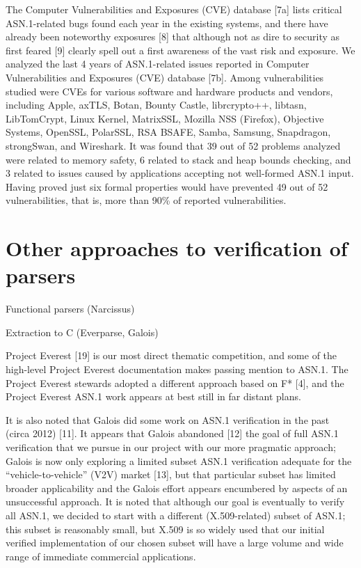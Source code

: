 \documentclass[acmsmall,nonacm]{acmart}
\begin{document}
 The Computer Vulnerabilities and Exposures (CVE) database [7a] lists critical ASN.1-related bugs found each year in the existing systems, and there have already been noteworthy exposures [8] that although not as dire to security as first feared [9] clearly spell out a first awareness of the vast risk and exposure. We analyzed the last 4 years of ASN.1-related issues reported in Computer Vulnerabilities and Exposures (CVE) database [7b]. Among vulnerabilities studied were CVEs for various software and hardware products and vendors, including Apple, axTLS, Botan, Bounty Castle, librcrypto++, libtasn, LibTomCrypt, Linux Kernel, MatrixSSL, Mozilla NSS (Firefox), Objective Systems, OpenSSL, PolarSSL, RSA BSAFE, Samba, Samsung, Snapdragon, strongSwan, and Wireshark. It was found that 39 out of 52 problems analyzed were related to memory safety, 6 related to stack and heap bounds checking, and 3 related to issues caused by applications accepting not well-formed ASN.1 input. Having proved just six formal properties would have prevented 49 out of 52 vulnerabilities, that is, more than 90\% of reported vulnerabilities.

 \section{Other approaches to verification of parsers}

  Functional parsers (Narcissus)

  Extraction to C (Everparse, Galois)

  Project Everest [19] is our most direct thematic competition, and some of the high-level Project Everest documentation makes passing mention to ASN.1. The Project Everest stewards adopted a different approach based on F* [4], and the Project Everest ASN.1 work  appears at best still in far distant plans.

It is also noted that Galois did some work on ASN.1 verification in the past (circa 2012) [11]. It appears that Galois abandoned [12] the goal of full ASN.1 verification that we pursue in our project with our more pragmatic approach; Galois is now only exploring a limited subset ASN.1 verification adequate for the “vehicle-to-vehicle” (V2V) market [13], but that particular subset has limited broader applicability and the Galois effort appears encumbered by aspects of an unsuccessful  approach. It is noted that although our goal is eventually to verify all ASN.1, we decided to start with a different (X.509-related) subset of ASN.1; this subset is reasonably small, but X.509 is so widely used that our initial verified implementation of our chosen subset will have a large volume and wide range of immediate commercial applications.
\end{document}
